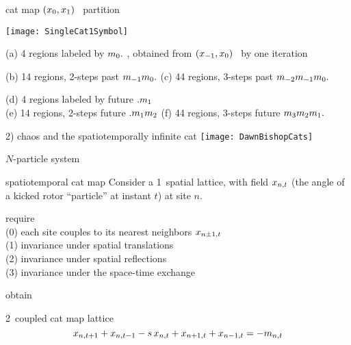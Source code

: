 \begin{frame}{cat map $(x_{0},x_{1})$  \statesp\ partition}
\begin{center}
	\texttt{[image: SingleCat1Symbol]}
\end{center}

{\scriptsize
(a) 4 regions labeled by ${m_{0}}.$ , obtained from
$(x_{-1},x_{0})$ \statesp\ by one iteration

\medskip

(b) 14 regions, 2-steps past ${m_{-1}}{m_{0}}.$
\quad (c) 44 regions, 3-steps past ${m_{-2}}{m_{-1}}{m_{0}}.$

\medskip

(d) 4 regions labeled by future $.{m_{1}}$
\\
(e) 14 regions, 2-steps  future $.{m_{1}}{m_{2}}$
\quad (f) 44 regions, 3-steps future {\brick} ${m_{3}}{m_{2}}{m_{1}}.$
}
\end{frame}

\begin{frame}{2) chaos and the spatiotemporally infinite cat}
\hfill\texttt{[image: DawnBishopCats]}

$N$-particle system
\end{frame}


\begin{frame}{spatiotemporal cat map
}
Consider
a 1\dmn\ spatial lattice, with field $x_{n,t}$  (the angle of a kicked
rotor ``particle'' at instant $t$)  at site $n$.

\bigskip

require
\\
(0) each site couples to
its nearest neighbors $x_{n\pm1,t}$
\\(1) invariance under
spatial translations
\\(2) invariance under spatial reflections
\\(3) invariance under the space-time exchange

\bigskip

obtain
\begin{block}{2\dmn\ coupled cat map lattice}
\[
x_{n,t+1} + x_{n,t-1} - s \, x_{n,t} + x_{n+1,t} + x_{n-1, t}
     =-{m_{n,t}}
\] %
\end{block}

\vfill


\end{frame}

